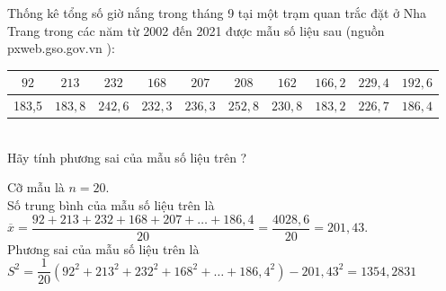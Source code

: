 \begin{ex}%
	Thống kê tổng số giờ nắng trong tháng 9 tại một trạm quan trắc đặt ở Nha Trang trong các năm từ 2002 đến 2021 được mẫu số liệu sau (nguồn pxweb.gso.gov.vn ):\\
	\begin{tabular}{|c|c|c|c|c|c| c| c| c| c|  }
		\hline
		$92$ & $213$ & $232$  & $168$ & $207$  & $208$ & $162$ & $166{,}2$ & $229{,}4$ & $192{,}6$   \\
		\hline
		183{,}5 & $183{,}8$  & $242{,}6$  & $232{,}3$  & $236{,}3$  & $252{,}8$  & $230{,}8$ & $183{,}2$  & $226{,}7$  & $186{,}4$      \\
		\hline
	\end{tabular}\\
	Hãy tính phương sai của mẫu số liệu trên ?
	
	\loigiai
	{
		Cỡ mẫu là $n = 20$.\\
		Số trung bình của mẫu số liệu trên là\\
		$\overline x  = \dfrac{92 + 213 + 232 + 168 + 207 + … + 186{,}4}{20} = \dfrac{4028{,}6}{20} = 201{,}43$.\\
		Phương sai của mẫu số liệu trên là\\
		${S^2} = \dfrac{1}{20}( 92^2 + 213^2 + 232^2 + 168^2 + … + 186{,}4^2) - 201{,}43^2 = 1354{,}2831$
		
	}
\end{ex}

